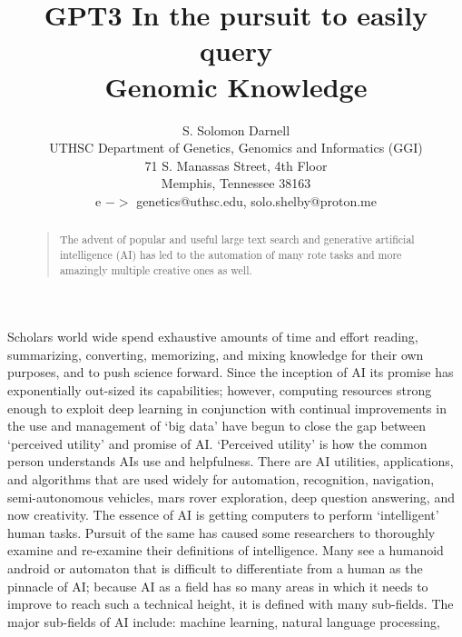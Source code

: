 \documentclass[letterpaper]{article}
\begin{document}
%
\title{GPT3 In the pursuit to easily query\\ Genomic Knowledge}
\author{S. Solomon Darnell\\
UTHSC Department of Genetics, Genomics and Informatics (GGI)\\
71 S. Manassas Street, 4th Floor\\
Memphis, Tennessee 38163\\
e $->$ genetics@uthsc.edu, solo.shelby@proton.me
}
\maketitle
\begin{abstract}
\begin{quote}
The advent of popular and useful large text search and generative artificial intelligence (AI) has led to the automation of many rote tasks and more amazingly multiple creative ones as well.
\end{quote}
\end{abstract}



\noindent Scholars world wide spend exhaustive amounts of time and effort reading, summarizing, converting, memorizing, and mixing knowledge for their own purposes, and to push science forward.
Since the inception of AI its promise has exponentially out-sized its capabilities; however, computing resources strong enough to exploit deep learning in conjunction with continual improvements in the use and management of `big data' have begun to close the gap between `perceived utility' and promise of AI.
`Perceived utility' is how the common person understands AIs use and helpfulness.
There are AI utilities, applications, and algorithms that are used widely for automation, recognition, navigation, semi-autonomous vehicles, mars rover exploration, deep question answering, and now creativity.
The essence of AI is getting computers to perform `intelligent' human tasks.
Pursuit of the same has caused some researchers to thoroughly examine and re-examine their definitions of intelligence.
Many see a humanoid android or automaton that is difficult to differentiate from a human as the pinnacle of AI; because AI as a field has so many areas in which it needs to improve to reach such a technical height, it is defined with many sub-fields.
The major sub-fields of AI include: machine learning, natural language processing, 
\cite{2022Azaria,2023Zhang,2023Foucart,2023DePeau-Wilson}
\end{document}
